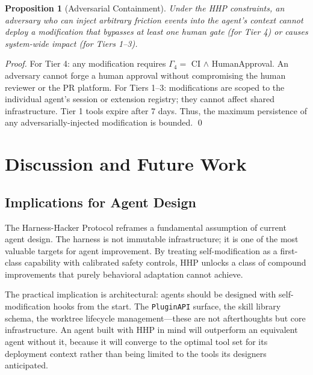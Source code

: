 \documentclass[11pt]{article}
\newtheorem{proposition}[theorem]{Proposition}
\begin{document}
\begin{proposition}[Adversarial Containment]
\label{prop:adversarial}
Under the HHP constraints, an adversary who can inject arbitrary friction events
into the agent's context cannot deploy a modification that bypasses at least
one human gate (for Tier 4) or causes system-wide impact (for Tiers 1--3).
\end{proposition}

\begin{proof}
For Tier 4: any modification requires $\Gamma_4 = $ CI $\wedge$ HumanApproval.
An adversary cannot forge a human approval without compromising the human
reviewer or the PR platform. For Tiers 1--3: modifications are scoped to the
individual agent's session or extension registry; they cannot affect shared
infrastructure. Tier 1 tools expire after 7 days. Thus, the maximum persistence
of any adversarially-injected modification is bounded. \qed
\end{proof}

\section{Discussion and Future Work}
\label{sec:discussion}

\subsection{Implications for Agent Design}
\label{sec:implications}

The Harness-Hacker Protocol reframes a fundamental assumption of current agent
design. The harness is not immutable infrastructure; it is one of the most
valuable targets for agent improvement. By treating self-modification as a
first-class capability with calibrated safety controls, HHP unlocks a class of
compound improvements that purely behavioral adaptation cannot achieve.

The practical implication is architectural: agents should be designed with
self-modification hooks from the start. The \texttt{PluginAPI} surface, the
skill library schema, the worktree lifecycle management---these are not
afterthoughts but core infrastructure. An agent built with HHP in mind will
outperform an equivalent agent without it, because it will converge to the
optimal tool set for its deployment context rather than being limited to the
tools its designers anticipated.
\end{document}
